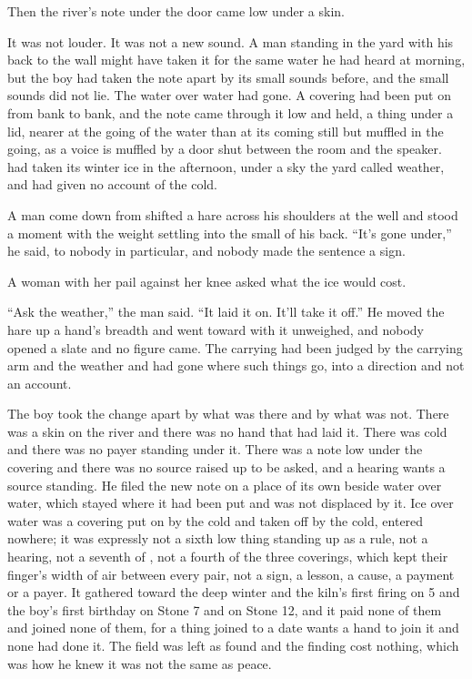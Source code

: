 Then the river's note under the door came low under a skin.

It was not louder. It was not a new sound. A man standing in the yard with his back to the wall might have taken it for the same water he had heard at morning, but the boy had taken the note apart by its small sounds before, and the small sounds did not lie. The water over water had gone. A covering had been put on from bank to bank, and the note came through it low and held, a thing under a lid, nearer at the going of the water than at its coming still but muffled in the going, as a voice is muffled by a door shut between the room and the speaker.  had taken its winter ice in the afternoon, under a sky the yard called weather, and had given no account of the cold.

A man come down from  shifted a hare across his shoulders at the well and stood a moment with the weight settling into the small of his back. “It's gone under,” he said, to nobody in particular, and nobody made the sentence a sign.

A woman with her pail against her knee asked what the ice would cost.

“Ask the weather,” the man said. “It laid it on. It'll take it off.” He moved the hare up a hand's breadth and went toward  with it unweighed, and nobody opened a slate and no figure came. The carrying had been judged by the carrying arm and the weather and had gone where such things go, into a direction and not an account.

The boy took the change apart by what was there and by what was not. There was a skin on the river and there was no hand that had laid it. There was cold and there was no payer standing under it. There was a note low under the covering and there was no source raised up to be asked, and a hearing wants a source standing. He filed the new note on a place of its own beside water over water, which stayed where it had been put and was not displaced by it. Ice over water was a covering put on by the cold and taken off by the cold, entered nowhere; it was expressly not a sixth low thing standing up as a rule, not a hearing, not a seventh of , not a fourth of the three coverings, which kept their finger's width of air between every pair, not a sign, a lesson, a cause, a payment or a payer. It gathered toward the deep winter and the kiln's first firing on  5 and the boy's first birthday on Stone 7 and  on Stone 12, and it paid none of them and joined none of them, for a thing joined to a date wants a hand to join it and none had done it. The field was left as found and the finding cost nothing, which was how he knew it was not the same as peace.


